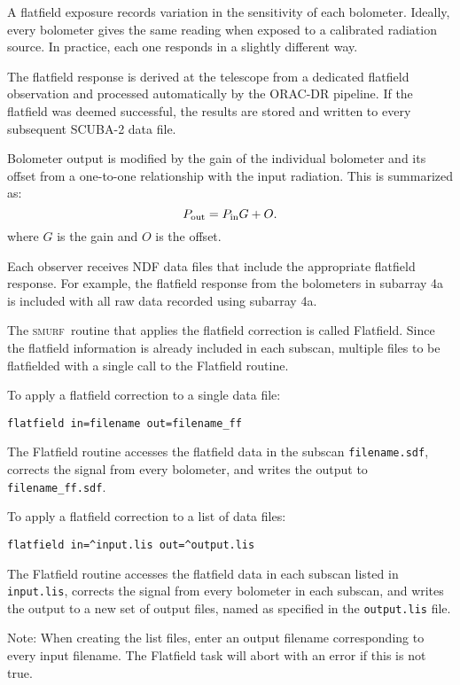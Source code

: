 \documentclass[twoside,11pt]{article}
\renewcommand{\_}{\texttt{\symbol{95}}}
\newcommand{\SMURF}{\textsc{smurf}}
\begin{document}
A flatfield exposure records variation in the sensitivity of each
bolometer. Ideally, every bolometer gives the same reading when
exposed to a calibrated radiation source. In practice, each one
responds in a slightly different way.

The flatfield response is derived at the telescope from a dedicated
flatfield observation and processed automatically by the ORAC-DR
pipeline. If the flatfield was deemed successful, the results are
stored and written to every subsequent SCUBA-2 data file.

Bolometer output is modified by the gain of the individual bolometer
and its offset from a one-to-one relationship with the input
radiation. This is summarized as:
\begin{equation}
P_{\rm out} = P_{\rm in} G + O.
\end{equation}
where $G$ is the gain and $O$ is the offset.

Each observer receives NDF data files that include the appropriate
flatfield response. For example, the flatfield response from the
bolometers in subarray 4a is included with all raw data recorded using
subarray 4a.

The \SMURF\ routine that applies the flatfield correction is called
Flatfield. Since the flatfield information is already included in each
subscan, multiple files to be flatfielded with a single call to the
Flatfield routine.

To apply a flatfield correction to a single data file:
\begin{verbatim}
flatfield in=filename out=filename_ff
\end{verbatim}
The Flatfield routine accesses the flatfield data in the subscan
\verb+filename.sdf+, corrects the signal from every bolometer, and
writes the output to \verb+filename_ff.sdf+.

To apply a flatfield correction to a list of data files:
\begin{verbatim}
flatfield in=^input.lis out=^output.lis
\end{verbatim}
The Flatfield routine accesses the flatfield data in each subscan
listed in \verb+input.lis+, corrects the signal from every bolometer
in each subscan, and writes the output to a new set of output files,
named as specified in the \verb+output.lis+ file.

Note: When creating the list files, enter an output filename
corresponding to every input filename. The Flatfield task will abort
with an error if this is not true.
\end{document}
